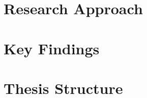 

\section{Research Approach} %
\label{sec:research_approach}




\section{Key Findings} %
\label{sec:key_findings}




\section{Thesis Structure} %
\label{sec:thesis_structure}





